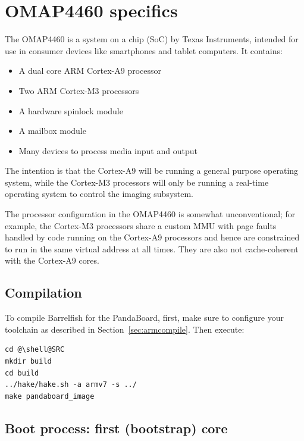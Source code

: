 \documentclass[a4paper,twoside]{report} %
\begin{document}
\section{OMAP4460 specifics}


The OMAP4460 is a system on a chip (SoC) by Texas Instruments,
intended for use in consumer devices like smartphones and tablet
computers. It contains:

\begin{itemize}
\item A dual core ARM Cortex-A9 processor
\item Two ARM Cortex-M3 processors
\item A hardware spinlock module
\item A mailbox module
\item Many devices to process media input and output
\end{itemize}

The intention is that the Cortex-A9 will be running a general purpose
operating system, while the Cortex-M3 processors will only be running
a real-time operating system to control the imaging subsystem.

The processor configuration in the OMAP4460 is somewhat
unconventional; for example, the Cortex-M3 processors share a
custom MMU with page faults handled by code running on the Cortex-A9
processors and hence are constrained to run in the same virtual
address at all times.  They are also not cache-coherent with the
Cortex-A9 cores. 

\subsection{Compilation}

To compile Barrelfish for the PandaBoard, first, make sure to
configure your toolchain as described in
Section~\ref{sec:armcompile}. Then execute:

\begin{lstlisting}
cd @\shell@SRC
mkdir build
cd build
../hake/hake.sh -a armv7 -s ../
make pandaboard_image
\end{lstlisting}

\subsection{Boot process: first (bootstrap) core}
\end{document}
